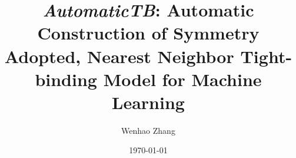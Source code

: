 \documentclass{article}
\begin{document}
    
\title{\emph{AutomaticTB}: Automatic Construction of Symmetry Adopted, Nearest Neighbor Tight-binding Model for Machine Learning}
\author{Wenhao Zhang}
\date{\today}
\maketitle

\begin{refsection}


\newpage


\newpage


\printbibliography[title={Reference}]

\end{refsection}


\begin{appendices}

\begin{refsection}





\printbibliography[heading=subbibliography]
\end{refsection}

\end{appendices}
\end{document}
